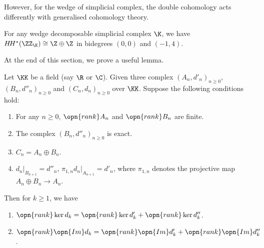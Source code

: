 However, for the wedge of simplicial complex, the double cohomology 
acts differently with generalised cohomology theory.

\begin{prop}
    \label{prop: double coho of wedge}
    For any wedge decomposable simplicial complex $\K$, we have
    $H\!H^*(\ZZ_{\K})\cong \Z\oplus\Z$
    in bidegrees $(0,0)$ and $(-1,4)$. 
\end{prop}

At the end of this section, we prove a useful lemma.
\begin{lem}
    \label{lem: dim ker}
    Let $\KK$ be a field (say $\R$ or $\C$).
    Given three complex $(A_n,d'_n)_{n\ge 0}$, $(B_n,d''_n)_{n\ge 0}$
    and $(C_n,d_n)_{n\ge 0}$
    over $\KK$. Suppose the following conditions hold:
    \begin{enumerate}
        \item 
        For any $n\ge 0$, $\opn{rank} A_n$ and $\opn{rank} B_n$ are finite.
        \item 
        The complex $(B_n,d''_n)_{n\ge 0}$ is exact.
        \item 
         $C_n=A_n\oplus B_n$.
        \item 
        $d_n|_{B_{n+1}}=d''_n$, $\pi_{1,n} d_n|_{A_{n+1}}=d'_n$,
        where $\pi_{1,n}$ denotes the projective map
        $A_n\oplus B_n\to A_n$.
    \end{enumerate}
    Then for $k\ge 1$, we have
    \begin{enumerate}
        \item 
        $\opn{rank} \ker d_k=\opn{rank} \ker d'_k+\opn{rank} \ker d''_k$.
        \item 
        $\opn{rank} \opn{Im} d_k=\opn{rank} \opn{Im} d'_k+
        \opn{rank} \opn{Im} d''_k$.
    \end{enumerate}
\end{lem}

